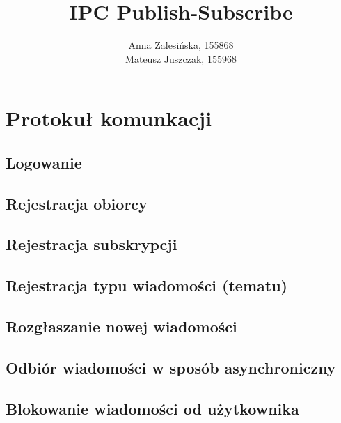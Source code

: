 \documentclass{article}
\begin{document}
	\title{IPC Publish-Subscribe}
	\author{Anna Zalesińska, 155868 \\ Mateusz Juszczak, 155968}
	\date{}
	\maketitle
	\section{Protokuł komunkacji}
	\subsection{Logowanie}
	\subsection{Rejestracja obiorcy}
	\subsection{Rejestracja subskrypcji}
	\subsection{Rejestracja typu wiadomości (tematu)}
	\subsection{Rozgłaszanie nowej wiadomości}
	\subsection{Odbiór wiadomości w sposób asynchroniczny}
	\subsection{Blokowanie wiadomości od użytkownika}
\end{document}
